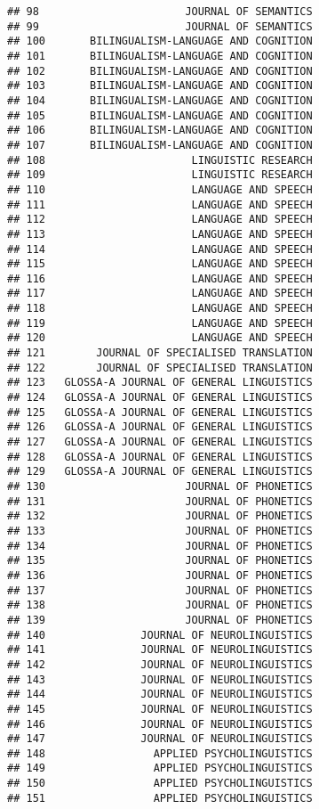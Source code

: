 \documentclass[
  english,
  man]{apa6}
\begin{document}
\begin{verbatim}
## 98                       JOURNAL OF SEMANTICS
## 99                       JOURNAL OF SEMANTICS
## 100       BILINGUALISM-LANGUAGE AND COGNITION
## 101       BILINGUALISM-LANGUAGE AND COGNITION
## 102       BILINGUALISM-LANGUAGE AND COGNITION
## 103       BILINGUALISM-LANGUAGE AND COGNITION
## 104       BILINGUALISM-LANGUAGE AND COGNITION
## 105       BILINGUALISM-LANGUAGE AND COGNITION
## 106       BILINGUALISM-LANGUAGE AND COGNITION
## 107       BILINGUALISM-LANGUAGE AND COGNITION
## 108                       LINGUISTIC RESEARCH
## 109                       LINGUISTIC RESEARCH
## 110                       LANGUAGE AND SPEECH
## 111                       LANGUAGE AND SPEECH
## 112                       LANGUAGE AND SPEECH
## 113                       LANGUAGE AND SPEECH
## 114                       LANGUAGE AND SPEECH
## 115                       LANGUAGE AND SPEECH
## 116                       LANGUAGE AND SPEECH
## 117                       LANGUAGE AND SPEECH
## 118                       LANGUAGE AND SPEECH
## 119                       LANGUAGE AND SPEECH
## 120                       LANGUAGE AND SPEECH
## 121        JOURNAL OF SPECIALISED TRANSLATION
## 122        JOURNAL OF SPECIALISED TRANSLATION
## 123   GLOSSA-A JOURNAL OF GENERAL LINGUISTICS
## 124   GLOSSA-A JOURNAL OF GENERAL LINGUISTICS
## 125   GLOSSA-A JOURNAL OF GENERAL LINGUISTICS
## 126   GLOSSA-A JOURNAL OF GENERAL LINGUISTICS
## 127   GLOSSA-A JOURNAL OF GENERAL LINGUISTICS
## 128   GLOSSA-A JOURNAL OF GENERAL LINGUISTICS
## 129   GLOSSA-A JOURNAL OF GENERAL LINGUISTICS
## 130                      JOURNAL OF PHONETICS
## 131                      JOURNAL OF PHONETICS
## 132                      JOURNAL OF PHONETICS
## 133                      JOURNAL OF PHONETICS
## 134                      JOURNAL OF PHONETICS
## 135                      JOURNAL OF PHONETICS
## 136                      JOURNAL OF PHONETICS
## 137                      JOURNAL OF PHONETICS
## 138                      JOURNAL OF PHONETICS
## 139                      JOURNAL OF PHONETICS
## 140               JOURNAL OF NEUROLINGUISTICS
## 141               JOURNAL OF NEUROLINGUISTICS
## 142               JOURNAL OF NEUROLINGUISTICS
## 143               JOURNAL OF NEUROLINGUISTICS
## 144               JOURNAL OF NEUROLINGUISTICS
## 145               JOURNAL OF NEUROLINGUISTICS
## 146               JOURNAL OF NEUROLINGUISTICS
## 147               JOURNAL OF NEUROLINGUISTICS
## 148                 APPLIED PSYCHOLINGUISTICS
## 149                 APPLIED PSYCHOLINGUISTICS
## 150                 APPLIED PSYCHOLINGUISTICS
## 151                 APPLIED PSYCHOLINGUISTICS

\end{verbatim}
\end{document}
